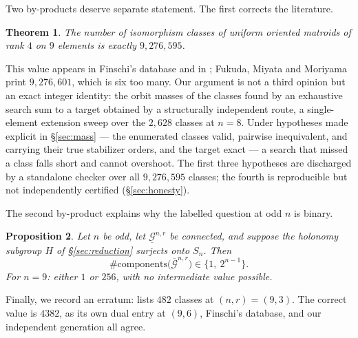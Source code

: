 \documentclass[11pt]{amsart}
\newtheorem{theorem}{Theorem}
\newtheorem{proposition}[theorem]{Proposition}
\theoremstyle{remark}
\newcommand{\Gb}{\overline{\mathcal{G}}}
\newcommand{\Gu}{\underline{\mathcal{G}}}
\begin{document}
Two by-products deserve separate statement. The first corrects the
literature.

\begin{theorem}\label{thm:count}
The number of isomorphism classes of uniform oriented matroids of rank
$4$ on $9$ elements is exactly $9{,}276{,}595$.
\end{theorem}

This value appears in Finschi's database \cite{Finschi} and in
\cite[Table 1]{KM23}; Fukuda, Miyata and Moriyama \cite[Table]{FMM13}
print $9{,}276{,}601$, which is six too many. Our argument is not a third
opinion but an exact integer identity: the orbit masses of the classes
found by an exhaustive search sum to a target obtained by a structurally
independent route, a single-element extension sweep over the $2{,}628$
classes at $n=8$. Under hypotheses made explicit in \S\ref{sec:mass} ---
the enumerated classes valid, pairwise inequivalent, and carrying their
true stabilizer orders, and the target exact --- a search that missed a
class falls short and cannot overshoot. The first three hypotheses are
discharged by a standalone checker over all $9{,}276{,}595$ classes; the
fourth is reproducible but not independently certified
(\S\ref{sec:honesty}).

The second by-product explains why the labelled question at odd $n$ is
binary.

\begin{proposition}\label{prop:dichotomy}
Let $n$ be odd, let $\Gu^{n,r}$ be connected, and suppose the holonomy
subgroup $H$ of \S\ref{sec:reduction} surjects onto $S_n$. Then
\[
  \#\mathrm{components}\bigl(\Gb^{n,r}\bigr)\in\{1,\ 2^{n-1}\}.
\]
For $n=9$: either $1$ or $256$, with no intermediate value possible.
\end{proposition}

Finally, we record an erratum: \cite[Table 1]{KM23} lists $482$ classes at
$(n,r)=(9,3)$. The correct value is $4382$, as its own dual entry at
$(9,6)$, Finschi's database, \cite{FMM13} and our independent generation
all agree.
\end{document}
